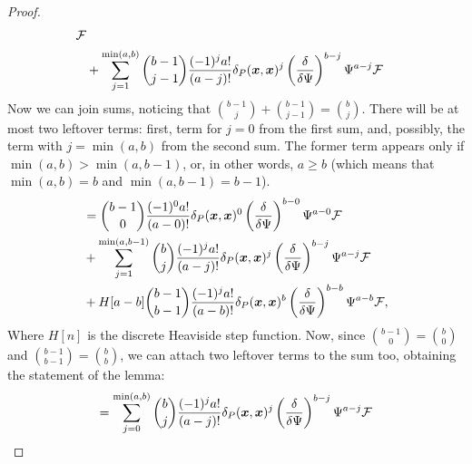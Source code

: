 \begin{proof}
\begin{equation*}
\begin{split}
			\mathcal{F} \\
	& + \sum_{j = 1}^{\min(a, b)}
			\binom{b-1}{j-1} \frac{(-1)^j a!}{(a-j)!} \delta_P(\boldsymbol{x}, \boldsymbol{x})^j
			\left( \frac{\delta}{\delta \Psi} \right)^{b-j} \Psi^{a-j}
			\mathcal{F}
\end{split}
\end{equation*}
Now we can join sums, noticing that $\binom{b-1}{j} + \binom{b-1}{j-1} = \binom{b}{j}$.
There will be at most two leftover terms: first, term for $j=0$ from the first sum,
and, possibly, the term with $j=\min(a,b)$ from the second sum.
The former term appears only if $\min(a,b) > \min(a, b-1)$,
or, in other words, $a \ge b$ (which means that $\min(a, b) = b$ and $\min(a, b-1) = b-1$).
\begin{equation*}
\begin{split}
	& = \binom{b-1}{0} \frac{(-1)^0 a!}{(a-0)!} \delta_P(\boldsymbol{x}, \boldsymbol{x})^0
			\left( \frac{\delta}{\delta \Psi} \right)^{b-0} \Psi^{a-0}
			\mathcal{F} \\
	& + \sum_{j = 1}^{\min(a, b-1)}
			\binom{b}{j} \frac{(-1)^j a!}{(a-j)!} \delta_P(\boldsymbol{x}, \boldsymbol{x})^j
			\left( \frac{\delta}{\delta \Psi} \right)^{b-j} \Psi^{a-j}
			\mathcal{F} \\
	& + H[a - b]
			\binom{b-1}{b-1} \frac{(-1)^j a!}{(a-b)!} \delta_P(\boldsymbol{x}, \boldsymbol{x})^b
			\left( \frac{\delta}{\delta \Psi} \right)^{b-b} \Psi^{a-b}
			\mathcal{F},
\end{split}
\end{equation*}
Where $H[n]$ is the discrete Heaviside step function.
Now, since $\binom{b-1}{0} = \binom{b}{0}$ and $\binom{b-1}{b-1} = \binom{b}{b}$,
we can attach two leftover terms to the sum too, obtaining the statement of the lemma:
\[
	= \sum_{j = 0}^{\min(a, b)}
		\binom{b}{j} \frac{(-1)^j a!}{(a-j)!} \delta_P(\boldsymbol{x}, \boldsymbol{x})^j
		\left( \frac{\delta}{\delta \Psi} \right)^{b-j} \Psi^{a-j}
		\mathcal{F}
	\qedhere
\]
\end{proof}

